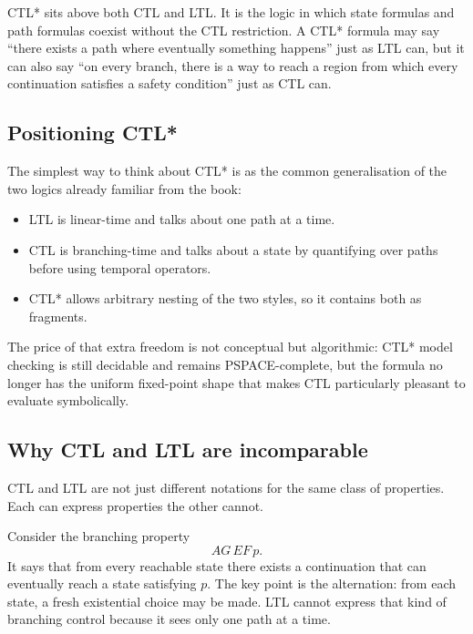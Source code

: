 CTL* sits above both CTL and LTL.  It is the logic in which state formulas and
path formulas coexist without the CTL restriction.  A CTL* formula may say
``there exists a path where eventually something happens'' just as LTL can,
but it can also say ``on every branch, there is a way to reach a region from
which every continuation satisfies a safety condition'' just as CTL can.

\subsection{Positioning CTL*}

The simplest way to think about CTL* is as the common generalisation of the
two logics already familiar from the book:
\begin{itemize}
  \item LTL is linear-time and talks about one path at a time.
  \item CTL is branching-time and talks about a state by quantifying over
        paths before using temporal operators.
  \item CTL* allows arbitrary nesting of the two styles, so it contains both
        as fragments.
\end{itemize}

\begin{remark}
The price of that extra freedom is not conceptual but algorithmic: CTL* model
checking is still decidable and remains PSPACE-complete, but the formula no
longer has the uniform fixed-point shape that makes CTL particularly pleasant
to evaluate symbolically.
\end{remark}

\subsection{Why CTL and LTL are incomparable}

CTL and LTL are not just different notations for the same class of properties.
Each can express properties the other cannot.

\begin{example}
Consider the branching property
\[
  AG\,EF\,p.
\]
It says that from every reachable state there exists a continuation that can
eventually reach a state satisfying $p$.  The key point is the alternation:
from each state, a fresh existential choice may be made.  LTL cannot express
that kind of branching control because it sees only one path at a time.
\end{example}

